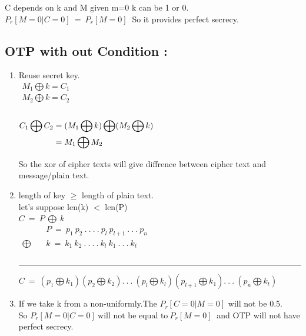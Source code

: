 \documentclass[11pt]{article}
\begin{document}
C depends on k and M given m=0 k can be 1 or 0.\\

$P_r[M=0|C=0]\ =\ P_r[M=0]\ $ So it provides perfect secrecy.

\newpage

\subsection{OTP with out Condition :}
\begin{enumerate}
    \item Reuse secret key.\\
    
    $\begin{aligned}
    M_1 \bigoplus k = C_1\\
    M_2 \bigoplus k = C_2\\\\
    \end{aligned}$
    
    $\begin{aligned}
    C_1 \bigoplus C_2 & = (M_1 \bigoplus k) \bigoplus (M_2 \bigoplus k) \\
    & = M_1 \bigoplus M_2 \\
    \end{aligned}\\$

    So the xor of cipher texts will give diffrence between cipher text and message/plain text.\\

    
    \item length of key $\ge$ length of plain text.\\
    let's suppose len(k) $<$ len(P)\\
    
    $C\ =\ P\ \bigoplus \ k$ \\
    
    $
    \begin{aligned}
    & P\ =\ p_1\ p_2\ .\ .\ .\ .\ p_l\ p_{l+1}\ .\ .\ .\ p_n\ \\ 
    \bigoplus \quad & k\ =\ k_1\ k_2\ .\ .\ .\ .\ k_l\ k_1\ .\ .\ .\ k_t \\\\
    \end{aligned}$

    \hrule

    $C\ =\ (p_1 \bigoplus k_1) (p_2 \bigoplus k_2) .\ .\ .\ (p_l \bigoplus k_l)(p_{l+1} \bigoplus k_1) .\ .\ .\ (p_n \bigoplus k_t)$\\
    

    \item If we take k from a non-uniformly.The $P_r[C=0|M=0]$ will not be 0.5.\\
    So $P_r[M=0|C=0]\ \text{will not be equal to} \ P_r[M=0]\ $ and OTP will not have perfect secrecy.
\end{enumerate}
\end{document}
